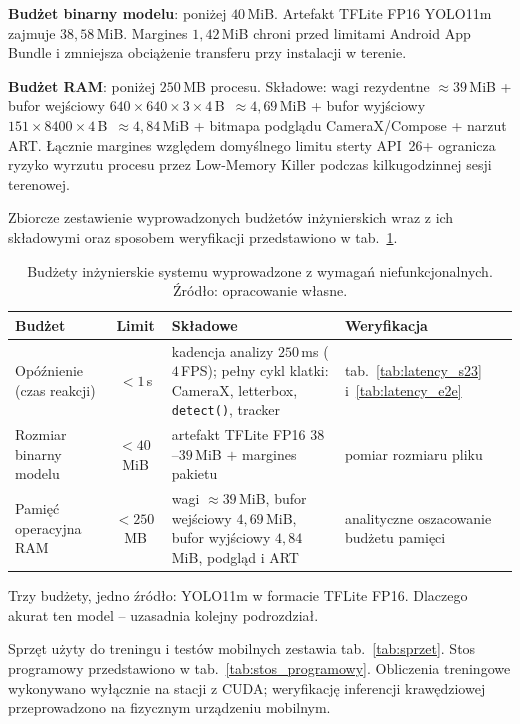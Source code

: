 \textbf{Budżet binarny modelu}: poniżej $40$\,MiB. Artefakt TFLite FP16 YOLO11m zajmuje $38{,}58$\,MiB. Margines $1{,}42$\,MiB chroni przed limitami Android App Bundle i zmniejsza obciążenie transferu przy instalacji w terenie.

\textbf{Budżet RAM}: poniżej $250$\,MB procesu. Składowe: wagi rezydentne ${\approx}39$\,MiB + bufor wejściowy $640{\times}640{\times}3{\times}4$\,B~${\approx}4{,}69$\,MiB + bufor wyjściowy $151{\times}8400{\times}4$\,B~${\approx}4{,}84$\,MiB + bitmapa podglądu CameraX/Compose + narzut ART. Łącznie margines względem domyślnego limitu sterty API~26+ ogranicza ryzyko wyrzutu procesu przez Low-Memory Killer podczas kilkugodzinnej sesji terenowej.

Zbiorcze zestawienie wyprowadzonych budżetów inżynierskich wraz z ich składowymi oraz sposobem weryfikacji przedstawiono w tab.~\ref{tab:budzety}.

\begin{table}[htbp]
 \centering
 \caption{Budżety inżynierskie systemu wyprowadzone z wymagań niefunkcjonalnych. Źródło: opracowanie własne.}
 \label{tab:budzety}
 \begin{tabular}{|p{2.9cm}|c|p{4.4cm}|p{3.1cm}|}
 \hline
 \textbf{Budżet} & \textbf{Limit} & \textbf{Składowe} & \textbf{Weryfikacja} \\
 \hline \hline
 Opóźnienie (czas reakcji) & $<1$\,s & kadencja analizy $250$\,ms ($4$\,FPS); pełny cykl klatki: CameraX, letterbox, \texttt{detect()}, tracker & tab.~\ref{tab:latency_s23} i~\ref{tab:latency_e2e} \\
 \hline
 Rozmiar binarny modelu & $<40$\,MiB & artefakt TFLite FP16 $38$--$39$\,MiB $+$ margines pakietu & pomiar rozmiaru pliku \\
 \hline
 Pamięć operacyjna RAM & $<250$\,MB & wagi $\approx39$\,MiB, bufor wejściowy $4{,}69$\,MiB, bufor wyjściowy $4{,}84$\,MiB, podgląd i ART & analityczne oszacowanie budżetu pamięci \\
 \hline
 \end{tabular}
\end{table}

Trzy budżety, jedno źródło: YOLO11m w formacie TFLite FP16. Dlaczego akurat ten model – uzasadnia kolejny podrozdział.

Sprzęt użyty do treningu i testów mobilnych zestawia tab.~\ref{tab:sprzet}. Stos programowy przedstawiono w tab.~\ref{tab:stos_programowy}. Obliczenia treningowe wykonywano wyłącznie na stacji z CUDA; weryfikację inferencji krawędziowej przeprowadzono na fizycznym urządzeniu mobilnym.

